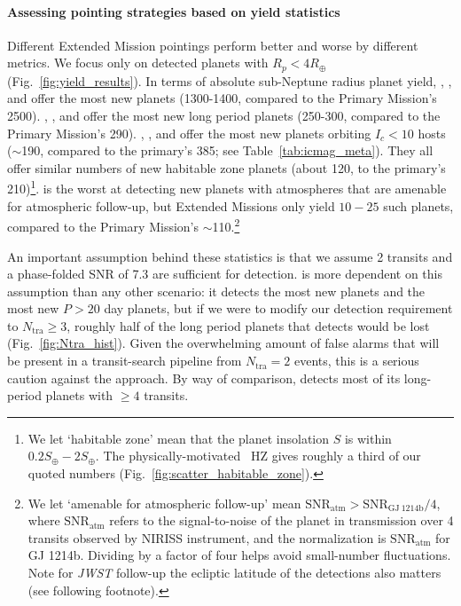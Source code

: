 \paragraph{Assessing pointing strategies based on yield statistics} 
Different Extended Mission pointings perform better and worse by different metrics.
We focus only on detected planets with $R_p<4R_\oplus$ (Fig.~\ref{fig:yield_results}).
In terms of absolute sub-Neptune radius planet yield, \hemis, \npole, and \shemiAvoid\:offer the most new planets (1300-1400, compared to the Primary Mission's 2500).
\hemis, \npole, and \npole\:offer the most new long period planets (250-300, compared to the Primary Mission's 290).
\hemis, \shemiAvoid, and \eshort\:offer the most new planets orbiting $I_c<10$ hosts ($\sim$190, compared to the primary's 385; see Table~\ref{tab:icmag_meta}).
They all offer similar numbers of new habitable zone planets (about 120, to the primary's 210)\footnote{We let `habitable zone' mean that the planet insolation $S$ is within $0.2S_\oplus-2S_\oplus$. The physically-motivated~\protect\citet{kopparapu_habitable_2013} HZ gives roughly a third of our quoted numbers (Fig.~\protect\ref{fig:scatter_habitable_zone}).}.
\npole\:is the worst at detecting new planets with atmospheres that are amenable for atmospheric follow-up, but Extended Missions only yield $10-25$ such planets, compared to the Primary Mission's $\sim$110.\footnote{We let `amenable for atmospheric follow-up' mean $\mathrm{SNR}_\mathrm{atm} > \mathrm{SNR}_\mathrm{GJ\ 1214b}/4 $, where $\mathrm{SNR}_\mathrm{atm}$ refers to the signal-to-noise of the planet in transmission over 4 transits observed by \jwsts NIRISS instrument, and the normalization is $\mathrm{SNR}_\mathrm{atm}$ for GJ 1214b. Dividing by a factor of four helps avoid small-number fluctuations. Note for \textit{JWST} follow-up the ecliptic latitude of the detections also matters (see following footnote).}

An important assumption behind these statistics is that we assume 2 transits and a phase-folded SNR of 7.3 are sufficient for detection.
\hemis\:is more dependent on this assumption than any other scenario: it detects the most new planets and the most new $P>20$ day planets, but if we were to modify our detection requirement to $N_\mathrm{tra}\geq 3$, roughly half of the long period planets that \hemis\:detects would be lost (Fig.~\ref{fig:Ntra_hist}).
Given the overwhelming amount of false alarms that will be present in a transit-search pipeline from $N_\mathrm{tra} = 2$ events, this is a serious caution against the \hemis\:approach.
By way of comparison, \npole\:detects most of its long-period planets with $\ge 4$ transits.



